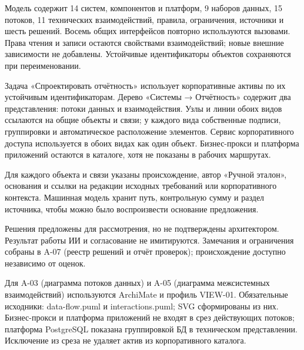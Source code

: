 \documentclass[10pt,a4paper]{article}
\begin{document}
Модель содержит 14 систем, компонентов и платформ, 9 наборов данных, 15 потоков, 11 технических взаимодействий, правила, ограничения, источники и шесть решений. Восемь общих интерфейсов повторно используются вызовами. Права чтения и записи остаются свойствами взаимодействий; новые внешние зависимости не добавлены. Устойчивые идентификаторы объектов сохраняются при переименовании.

Задача «Спроектировать отчётность» использует корпоративные активы по их устойчивым идентификаторам. Дерево «Системы → Отчётность» содержит два представления: потоки данных и взаимодействия. Узлы и линии обоих видов ссылаются на общие объекты и связи; у каждого вида собственные подписи, группировки и автоматическое расположение элементов. Сервис корпоративного доступа используется в обоих видах как один объект. Бизнес-прокси и платформа приложений остаются в каталоге, хотя не показаны в рабочих маршрутах.

Для каждого объекта и связи указаны происхождение, автор «Ручной эталон», основания и ссылки на редакции исходных требований или корпоративного контекста. Машинная модель хранит путь, контрольную сумму и раздел источника, чтобы можно было воспроизвести основание предложения.

Решения предложены для рассмотрения, но не подтверждены архитектором. Результат работы ИИ и согласование не имитируются. Замечания и ограничения собраны в A-07 (реестр решений и отчёт проверок); происхождение доступно независимо от оценок.

Для A-03 (диаграмма потоков данных) и A-05 (диаграмма межсистемных взаимодействий) используются ArchiMate и профиль VIEW-01. Обязательные исходники: {data-flow.puml} и {interactions.puml}; SVG сформированы из них. Бизнес-прокси и платформа приложений не входят в срез действующих потоков; платформа PostgreSQL показана группировкой БД в техническом представлении. Исключение из среза не удаляет актив из корпоративного каталога.
\end{document}
